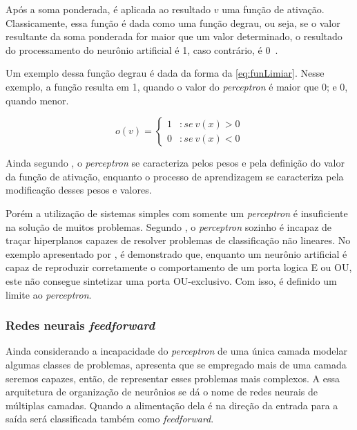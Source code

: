 \documentclass[
    12pt,
    oneside,
    a4paper,
    english,
    brazil
]{abntex2}
\begin{document}
Após a  soma ponderada,  é aplicada  ao resultado $v$  uma função  de ativação.
Classicamente, essa função é  dada como uma função degrau, ou  seja, se o valor
resultante da soma ponderada for maior que um valor determinado, o resultado do
processamento do neurônio artificial é 1, caso contrário, é 0~\cite{knight}.

Um exemplo dessa função degrau é dada da forma da \autoref{eq:funLimiar}. Nesse
exemplo, a função  resulta em 1, quando o valor  do \textit{perceptron} é maior
que 0; e 0, quando menor.

\begin{equation}
    \label{eq:funLimiar}
    o(v) = \left\{
        \begin{array}{lr}
            1 & :se\  v(x) > 0\\
            0 & :se\  v(x) < 0
        \end{array}
    \right.
\end{equation}

Ainda segundo  , o \textit{perceptron} se  caracteriza pelos
pesos e pela definição  do valor da função de ativação,  enquanto o processo de
aprendizagem se caracteriza pela modificação desses pesos e valores.

Porém a  utilização de  sistemas simples com  somente um  \textit{perceptron} é
insuficiente  na  solução  de muitos  problemas.  Segundo  ,
o  \textit{perceptron}  sozinho é  incapaz  de  traçar hiperplanos  capazes  de
resolver problemas  de classificação não  lineares. No exemplo  apresentado por
, é demonstrado que, enquanto um neurônio artificial é capaz
de reproduzir corretamente o comportamento de um porta logica E ou OU, este não
consegue sintetizar uma  porta OU-exclusivo. Com isso, é definido  um limite ao
\textit{perceptron}.

\subsubsection{Redes neurais \textit{feedforward}}

Ainda considerando  a incapacidade do  \textit{perceptron} de uma  única camada
modelar  algumas classes  de  problemas,   apresenta que  se
empregado  mais de  uma camada  seremos  capazes, então,  de representar  esses
problemas mais  complexos. A  essa arquitetura de  organização de  neurônios se
dá  o  nome  de  redes  neurais de  múltiplas  camadas.  Quando  a  alimentação
dela  é na  direção  da entrada  para  a saída  será  classificada também  como
\textit{feedforward}.
\end{document}

